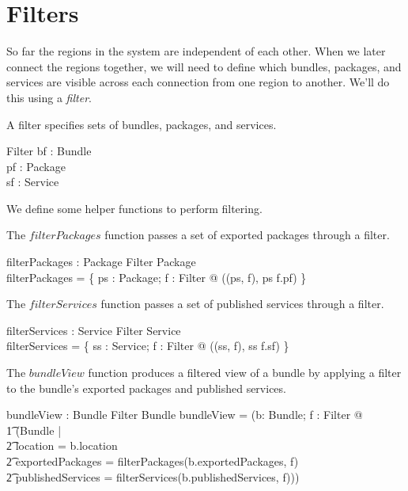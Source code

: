 \documentclass[a4paper,9pt]{article}
\begin{document}
\clearpage
\section{Filters}
\label{cha:filters}

So far the regions in the system are independent of each other.
When we later connect the regions together, we will need to define which bundles,
packages, and services are visible across each connection from one region to another.
We'll do this using a \textit{filter}.

A filter specifies sets of bundles, packages, and services.
\begin{schema}{Filter}
  bf : \power Bundle \\
  pf : \power Package \\
  sf : \power Service \\
\end{schema}

We define some helper functions to perform filtering.

The $filterPackages$ function passes a set of exported packages through a filter.
\begin{axdef}
  filterPackages : \power Package \cross Filter \fun \power Package \\
\where
  filterPackages = \{ ps : \power Package; f : Filter @ ((ps, f), ps \cap f.pf) \}
\end{axdef}

The $filterServices$ function passes a set of published services through a filter.
\begin{axdef}
  filterServices : \power Service \cross Filter \fun \power Service \\
\where
  filterServices = \{ ss : \power Service; f : Filter @ ((ss, f), ss \cap f.sf) \}
\end{axdef}

The $bundleView$ function produces a filtered view of a bundle by applying a filter to the bundle's exported packages and published services.
\begin{axdef}
  bundleView : Bundle \cross Filter \fun Bundle
\where
  bundleView = (\lambda b: Bundle; f : Filter @ \\
\t1  (\mu Bundle | \\
\t2 location = b.location \land \\
\t2 exportedPackages = filterPackages(b.exportedPackages, f) \land \\
\t2 publishedServices = filterServices(b.publishedServices, f)))
\end{axdef}
\end{document}
